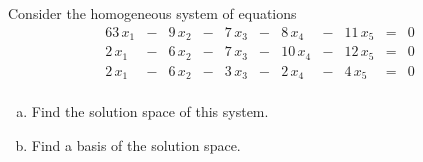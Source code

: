 
\begin{exerciseStatement}


Consider the homogeneous system of equations 
\begin{alignat*}{6} 3 \, x_{1} &-& 9 \, x_{2} &-& 7 \, x_{3} &-& 8 \, x_{4} &-& 11 \, x_{5} &=& 0 \\2 \, x_{1} &-& 6 \, x_{2} &-& 7 \, x_{3} &-& 10 \, x_{4} &-& 12 \, x_{5} &=& 0 \\2 \, x_{1} &-& 6 \, x_{2} &-& 3 \, x_{3} &-& 2 \, x_{4} &-& 4 \, x_{5} &=& 0 \\ \end{alignat*}
            


\begin{enumerate}[(a)]
\item  Find the solution space of this system.
\item  Find a basis of the solution space.
\end{enumerate}
    
\end{exerciseStatement}
    
